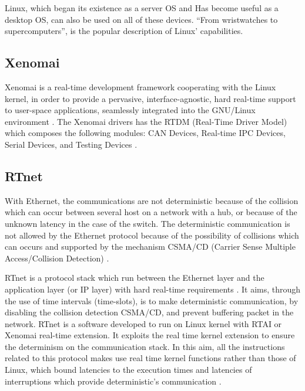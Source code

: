 \documentclass[conference]{IEEEtran}
\begin{document}
Linux, which began its existence as a server OS and Has become useful as a desktop OS, can also be used on all of these devices. “From wristwatches to supercomputers”, is the popular description of Linux' capabilities. \cite{linux_foundation}

%
\subsection{Xenomai}\label{subsec:xenomai}

Xenomai \cite{xenomai_api} is a real-time development framework cooperating with the Linux kernel, in order to provide a pervasive, interface-agnostic, hard real-time support to user-space applications, seamlessly integrated into the GNU/Linux environment \cite{xenomai_x_linux}. The Xenomai drivers has the RTDM (Real-Time Driver Model) which composes the following modules: CAN Devices, Real-time IPC Devices, Serial Devices, and Testing Devices \cite{rtdm_Kiszka}.

%
\subsection{RTnet}\label{subsec:rtnet}

With Ethernet, the communications are not deterministic because of the collision which can occur between several host on a network with a hub, or because of the unknown latency in the case of the switch. The deterministic communication is not allowed by the Ethernet protocol because of the possibility of collisions which can occurs and supported by the mechanism CSMA/CD (Carrier Sense Multiple Access/Collision Detection) \cite{rtnet_IEEE_so53551}.

RTnet is a protocol stack which run between the Ethernet layer and the application layer (or IP layer) with hard real-time requirements \cite{rtnet_org}. It aims, through the use of time intervals (time-slots), is to make deterministic communication, by disabling the collision detection CSMA/CD, and prevent buffering packet in the network. RTnet is a software developed to run on Linux kernel with RTAI or Xenomai real-time extension. It exploits the real time kernel extension to ensure the determinism on the communication stack. In this aim, all the instructions related to this protocol makes use real time kernel functions rather than those of Linux, which bound latencies to the execution times and latencies of interruptions which provide deterministic’s communication \cite{rtnet_from_xenomai}.
\end{document}
